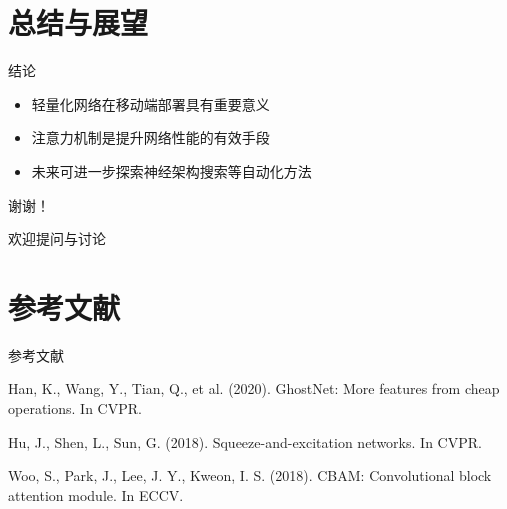 \documentclass[10pt]{beamer}
\begin{document}
\section{总结与展望}
\begin{frame}{结论}
\begin{itemize}
\item 轻量化网络在移动端部署具有重要意义
\item 注意力机制是提升网络性能的有效手段
\item 未来可进一步探索神经架构搜索等自动化方法
\end{itemize}
\end{frame}

{
\begin{frame}[standout]
\centering
\Huge{谢谢！}
\vspace{1cm}

\Large{欢迎提问与讨论}
\end{frame}
}

\section*{参考文献}
\begin{frame}[allowframebreaks]{参考文献}
\begin{thebibliography}{99}
Han, K., Wang, Y., Tian, Q., et al. (2020). GhostNet: More features from cheap operations. In CVPR.

Hu, J., Shen, L., Sun, G. (2018). Squeeze-and-excitation networks. In CVPR.

Woo, S., Park, J., Lee, J. Y., Kweon, I. S. (2018). CBAM: Convolutional block attention module. In ECCV.
\end{thebibliography}
\end{frame}

\end{document}

